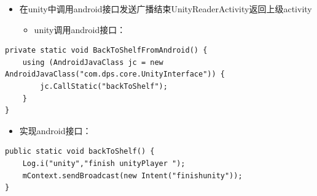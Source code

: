 \documentclass[9pt, b5paper]{article}
\begin{document}
\begin{itemize}
\item 在unity中调用android接口发送广播结束UnityReaderActivity返回上级activity
\begin{itemize}
\item unity调用android接口：
\end{itemize}
\end{itemize}
\begin{verbatim}
private static void BackToShelfFromAndroid() {
    using (AndroidJavaClass jc = new AndroidJavaClass("com.dps.core.UnityInterface")) {
        jc.CallStatic("backToShelf");
    }
}
\end{verbatim}
\begin{itemize}
\item 实现android接口：
\end{itemize}
\begin{verbatim}
public static void backToShelf() {
    Log.i("unity","finish unityPlayer ");
    mContext.sendBroadcast(new Intent("finishunity"));
}
\end{verbatim}
\end{document}

